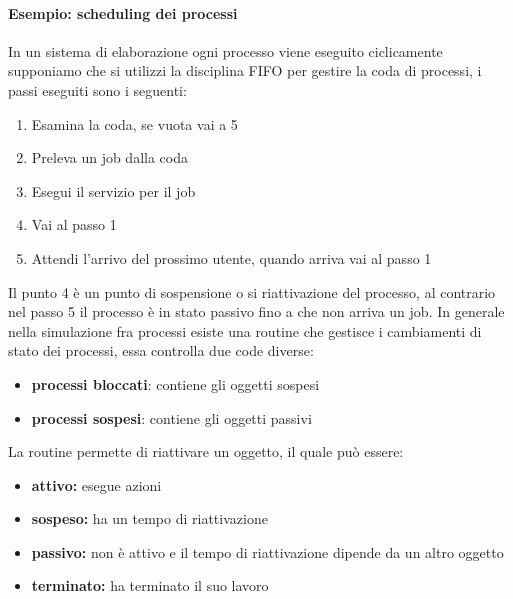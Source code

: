 \paragraph{Esempio: scheduling dei processi}
In un sistema di elaborazione ogni processo viene eseguito ciclicamente supponiamo che si utilizzi la disciplina FIFO per gestire la coda di processi, i passi eseguiti sono i seguenti:
\begin{enumerate}
    \item Esamina la coda, se vuota vai a 5
    \item Preleva un job dalla coda
    \item Esegui il servizio per il job
    \item Vai al passo 1
    \item Attendi l'arrivo del prossimo utente, quando arriva vai al passo 1
\end{enumerate}
Il punto 4 è un punto di sospensione o si riattivazione del processo, al contrario nel passo 5 il processo è in stato passivo fino a che non arriva un job. In generale nella simulazione fra processi esiste una routine che gestisce i cambiamenti di stato dei processi, essa controlla due code diverse:
\begin{itemize}
    \item \textbf{processi bloccati}: contiene gli oggetti sospesi
    \item \textbf{processi sospesi}: contiene gli oggetti passivi
\end{itemize}
La routine permette di riattivare un oggetto, il quale può essere:
\begin{itemize}
    \item \textbf{attivo:} esegue azioni
    \item \textbf{sospeso:} ha un tempo di riattivazione
    \item \textbf{passivo:} non è attivo e il tempo di riattivazione dipende da un altro oggetto
    \item \textbf{terminato:} ha terminato il suo lavoro
\end{itemize}

